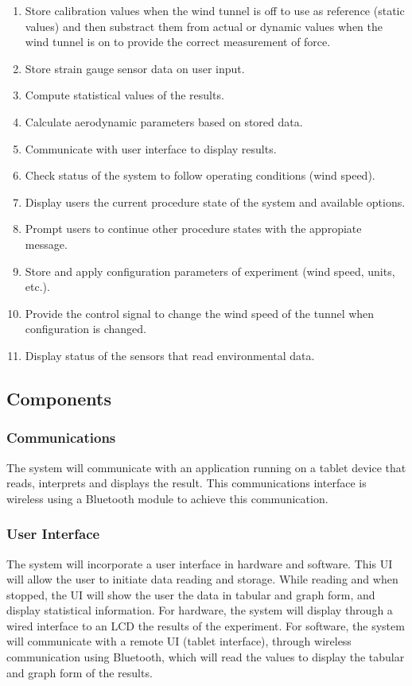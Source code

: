 		\begin{enumerate}
			\item Store calibration values when the wind tunnel is off to use as reference (static values) and then substract them from actual or dynamic values when the wind tunnel is on to provide the correct measurement of force.
			\item Store strain gauge sensor data on user input.
			\item Compute statistical values of the results.
			\item Calculate aerodynamic parameters based on stored data.
			\item Communicate with user interface to display results.
			\item Check status of the system to follow operating conditions (wind speed).
			\item Display users the current procedure state of the system and available options.
			\item Prompt users to continue other procedure states with the appropiate message.
			\item Store and apply configuration parameters of experiment (wind speed, units, etc.). 
			\item Provide the control signal to change the wind speed of the tunnel when configuration is changed.
			\item Display status of the sensors that read environmental data.
		\end{enumerate}


	\subsection{Components}
		\subsubsection{Communications}
			The system will communicate with an application running on a tablet device that reads, interprets and displays the result. This communications interface is wireless using a Bluetooth module to achieve this communication.

		\subsubsection{User Interface}
			The system will incorporate a user interface in hardware and software. This UI will allow the user to initiate data reading and storage. While reading and when stopped,
			the UI will show the user the data in tabular and graph form, and display statistical information. For hardware, the system will display through a wired interface to an LCD the results of the experiment. For software, the system will communicate with a remote UI (tablet interface), through wireless communication using Bluetooth, which will read the values to display the tabular and graph form of the results.

